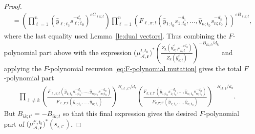 \documentclass{amsart}
\numberwithin{equation}{section}
\newcommand{\bfr}{{\boldsymbol{r}}}
\newcommand{\cA}{\mathcal{A}}
\begin{document}
\begin{proof}
\begin{align*}
    &=\left(\prod_{\ell=1}^n (\hat y_{\ell;t_0} s_{\ell;t_0}^{-d_\ell})^{\varepsilon C_{\ell k;t}}\right) \prod_{\ell=1}^n \left(F_{\ell,\bfr;t}(\hat y_{1;t_0} s_{1;t_0}^{-d_1},\ldots,\hat y_{n;t_0} s_{n;t_0}^{-d_n})\right)^{\varepsilon B_{\ell k;t}},
  \end{align*}
  where the last equality used Lemma~\ref{le:dual vectors}.
  Thus combining the $F$-polynomial part above with the expression $\big(\mu_{\cA,\bfr}^{t,t_0}\big)^*\left(\frac{Z_k\left(\hat y_{k;t}^\varepsilon s_{k;t}^{-\varepsilon d_k}\right)}{Z_k(\hat y_{k;t}^\varepsilon)}\right)^{-B_{ik;t}/d_k}$ and applying the $F$-polynomial recursion \eqref{eq:F-polynomial mutation} gives the total $F$-polynomial part
  \begin{align*}
    \prod_{\ell\ne k} \left(\frac{F_{\ell,\bfr;t}(\hat y_{1;t_0} s_{1;t_0}^{-d_1},\ldots,\hat y_{n;t_0} s_{n;t_0}^{-d_n})}{F_{\ell,\bfr;t}(\hat y_{1;t_0},\ldots,\hat y_{n;t_0})}\right)^{B_{i\ell;t'}/d_\ell}
    \left(\frac{F_{k,\bfr;t'}(\hat y_{1;t_0} s_{1;t_0}^{-d_1},\ldots,\hat y_{n;t_0} s_{n;t_0}^{-d_n})}{F_{k,\bfr;t'}(\hat y_{1;t_0},\ldots,\hat y_{n;t_0})}\right)^{-B_{ik;t}/d_k}.
  \end{align*}
  But $B_{ik;t'}=-B_{ik;t}$ so that this final expression gives the desired $F$-polynomial part of $\big(\mu_{\cA,\bfr}^{t',t_0}\big)^*(s_{i;t'})$.
\end{proof}
\end{document}
